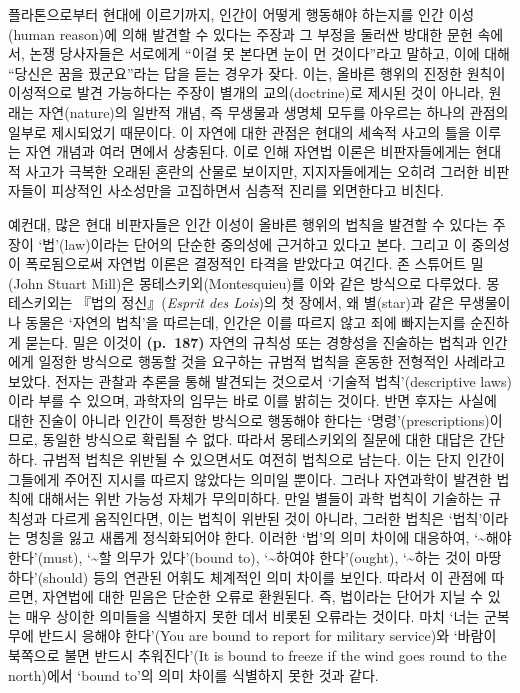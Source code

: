플라톤으로부터 현대에 이르기까지, 인간이 어떻게 행동해야 하는지를 인간
이성(human reason)에 의해 발견할 수 있다는 주장과 그 부정을 둘러싼
방대한 문헌 속에서, 논쟁 당사자들은 서로에게 ``이걸 못 본다면 눈이 먼
것이다''라고 말하고, 이에 대해 ``당신은 꿈을 꿨군요''라는 답을 듣는
경우가 잦다. 이는, 올바른 행위의 진정한 원칙이 이성적으로 발견
가능하다는 주장이 별개의 교의(doctrine)로 제시된 것이 아니라, 원래는
자연(nature)의 일반적 개념, 즉 무생물과 생명체 모두를 아우르는 하나의
관점의 일부로 제시되었기 때문이다. 이 자연에 대한 관점은 현대의 세속적
사고의 틀을 이루는 자연 개념과 여러 면에서 상충된다. 이로 인해 자연법
이론은 비판자들에게는 현대적 사고가 극복한 오래된 혼란의 산물로
보이지만, 지지자들에게는 오히려 그러한 비판자들이 피상적인 사소성만을
고집하면서 심층적 진리를 외면한다고 비친다.

예컨대, 많은 현대 비판자들은 인간 이성이 올바른 행위의 법칙을 발견할 수
있다는 주장이 `법'(law)이라는 단어의 단순한 중의성에 근거하고 있다고
본다. 그리고 이 중의성이 폭로됨으로써 자연법 이론은 결정적인 타격을
받았다고 여긴다. 존 스튜어트 밀(John Stuart Mill)은
몽테스키외(Montesquieu)를 이와 같은 방식으로 다루었다. 몽테스키외는
『법의 정신』(\emph{Esprit des Lois})의 첫 장에서, 왜 별(star)과 같은
무생물이나 동물은 `자연의 법칙'을 따르는데, 인간은 이를 따르지 않고 죄에
빠지는지를 순진하게 묻는다. 밀은 이것이 \textbf{(p.~187)} 자연의 규칙성
또는 경향성을 진술하는 법칙과 인간에게 일정한 방식으로 행동할 것을
요구하는 규범적 법칙을 혼동한 전형적인 사례라고 보았다. 전자는 관찰과
추론을 통해 발견되는 것으로서 `기술적 법칙'(descriptive laws)이라 부를
수 있으며, 과학자의 임무는 바로 이를 밝히는 것이다. 반면 후자는 사실에
대한 진술이 아니라 인간이 특정한 방식으로 행동해야 한다는
`명령'(prescriptions)이므로, 동일한 방식으로 확립될 수 없다. 따라서
몽테스키외의 질문에 대한 대답은 간단하다. 규범적 법칙은 위반될 수
있으면서도 여전히 법칙으로 남는다. 이는 단지 인간이 그들에게 주어진
지시를 따르지 않았다는 의미일 뿐이다. 그러나 자연과학이 발견한 법칙에
대해서는 위반 가능성 자체가 무의미하다. 만일 별들이 과학 법칙이 기술하는
규칙성과 다르게 움직인다면, 이는 법칙이 위반된 것이 아니라, 그러한
법칙은 `법칙'이라는 명칭을 잃고 새롭게 정식화되어야 한다. 이러한 `법'의
의미 차이에 대응하여, `\textasciitilde 해야 한다'(must),
`\textasciitilde 할 의무가 있다'(bound to), `\textasciitilde 하여야
한다'(ought), `\textasciitilde 하는 것이 마땅하다'(should) 등의 연관된
어휘도 체계적인 의미 차이를 보인다. 따라서 이 관점에 따르면, 자연법에
대한 믿음은 단순한 오류로 환원된다. 즉, 법이라는 단어가 지닐 수 있는
매우 상이한 의미들을 식별하지 못한 데서 비롯된 오류라는 것이다. 마치
`너는 군복무에 반드시 응해야 한다'(You are bound to report for military
service)와 `바람이 북쪽으로 불면 반드시 추워진다'(It is bound to freeze
if the wind goes round to the north)에서 `bound to'의 의미 차이를
식별하지 못한 것과 같다.

